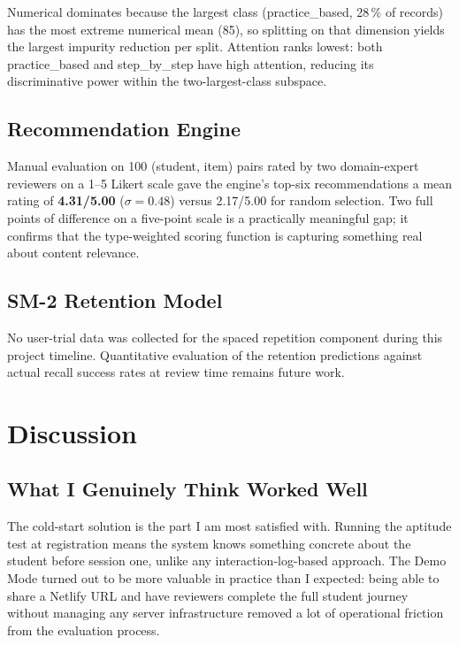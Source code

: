 \documentclass[12pt,a4paper]{article}
\begin{document}
Numerical dominates because the largest class (practice\_based,
28\,\% of records) has the most extreme numerical mean (85), so
splitting on that dimension yields the largest impurity reduction per
split. Attention ranks lowest: both practice\_based and step\_by\_step
have high attention, reducing its discriminative power within the
two-largest-class subspace.

\subsection{Recommendation Engine}

Manual evaluation on 100 (student, item) pairs rated by two
domain-expert reviewers on a 1--5 Likert scale gave the engine's
top-six recommendations a mean rating of \textbf{4.31/5.00}
($\sigma = 0.48$) versus 2.17/5.00 for random selection. Two full
points of difference on a five-point scale is a practically
meaningful gap; it confirms that the type-weighted scoring function
is capturing something real about content relevance.

\subsection{SM-2 Retention Model}

No user-trial data was collected for the spaced repetition component
during this project timeline. Quantitative evaluation of the
retention predictions against actual recall success rates at review
time remains future work.

\section{Discussion}

\subsection{What I Genuinely Think Worked Well}

The cold-start solution is the part I am most satisfied with.
Running the aptitude test at registration means the system knows
something concrete about the student before session one, unlike
any interaction-log-based approach. The Demo Mode turned out to be
more valuable in practice than I expected: being able to share a
Netlify URL and have reviewers complete the full student journey
without managing any server infrastructure removed a lot of
operational friction from the evaluation process.
\end{document}

